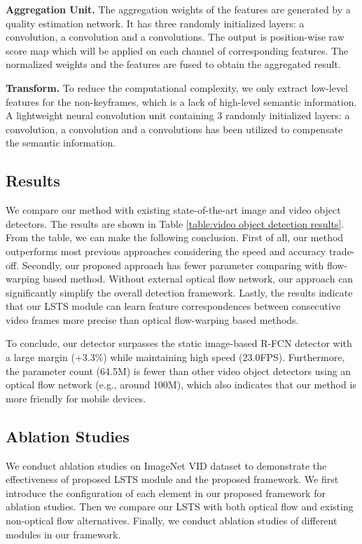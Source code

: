 \documentclass[runningheads]{llncs}
\begin{document}
\noindent \textbf{Aggregation Unit.}
The aggregation weights of the features are generated by a quality estimation network. It has three randomly initialized layers: a  convolution, a  convolution and a  convolutions. The output is position-wise raw score map which will be applied on each channel of corresponding features. The normalized weights and the features are fused to obtain the aggregated result.

\noindent \textbf{Transform.}
To reduce the computational complexity, we only extract low-level features for the non-keyframes, which is a lack of high-level semantic information. A lightweight neural convolution unit containing 3 randomly initialized layers: a  convolution, a  convolution and a  convolutions has been utilized to compensate the semantic information.

\subsection{Results}

We compare our method with existing state-of-the-art image and video object detectors. The results are shown in Table \ref{table:video object detection results}. From the table, we can make the following conclusion. First of all, our method outperforms most previous approaches considering the speed and accuracy trade-off. Secondly, our proposed approach has fewer parameter comparing with flow-warping based method. Without external optical flow network, our approach can significantly simplify the overall detection framework. Lastly, the results indicate that our LSTS module can learn feature correspondences between consecutive video frames more precise than optical flow-warping based methods.

To conclude, our detector surpasses the static image-based R-FCN detector with a large margin (+3.3\%) while maintaining high speed (23.0FPS). Furthermore, the parameter count (64.5M) is fewer than other video object detectors using an optical flow network (e.g., around 100M), which also indicates that our method is more friendly for mobile devices.


\subsection{Ablation Studies}
We conduct ablation studies on ImageNet VID dataset to demonstrate the effectiveness of proposed LSTS module and the proposed framework. We first introduce the configuration of each element in our proposed framework for ablation studies. Then we compare our LSTS with both optical flow and existing non-optical flow alternatives. Finally, we conduct ablation studies of different modules in our framework.
\end{document}
